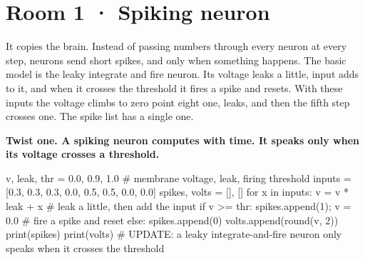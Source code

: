 \documentclass[11pt,a4paper]{report}
\begin{document}
\section*{Room 1 · Spiking neuron}
It copies the brain. Instead of passing numbers through every neuron at every step, neurons send short spikes, and only when something happens. The basic model is the leaky integrate and fire neuron. Its voltage leaks a little, input adds to it, and when it crosses the threshold it fires a spike and resets. With these inputs the voltage climbs to zero point eight one, leaks, and then the fifth step crosses one. The spike list has a single one.
\begin{tcolorbox}[colback=yellow!12,colframe=orange!70!black,boxrule=0.4pt,left=4pt,right=4pt,top=2pt,bottom=2pt]\textbf{Twist one. A spiking neuron computes with time. It speaks only when its voltage crosses a threshold.}\end{tcolorbox}
\begin{Code}
v, leak, thr = 0.0, 0.9, 1.0                # membrane voltage, leak, firing threshold
inputs = [0.3, 0.3, 0.3, 0.0, 0.5, 0.5, 0.0, 0.0]
spikes, volts = [], []
for x in inputs:
    v = v * leak + x                        # leak a little, then add the input
    if v >= thr:
        spikes.append(1); v = 0.0           # fire a spike and reset
    else:
        spikes.append(0)
    volts.append(round(v, 2))
print(spikes)
print(volts)
# UPDATE: a leaky integrate-and-fire neuron only speaks when it crosses the threshold
\end{Code}
\begin{Out}
[0, 0, 0, 0, 1, 0, 0, 0]
[0.3, 0.57, 0.81, 0.73, 0.0, 0.5, 0.45, 0.41]
\end{Out}
\end{document}
